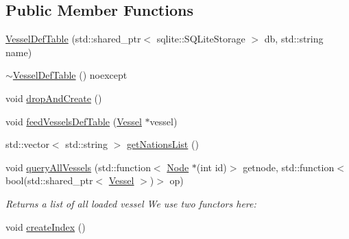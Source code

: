 \subsection*{Public Member Functions}
\begin{DoxyCompactItemize}
\item 
\mbox{\hyperlink{class_vessel_def_table_ae53e48fba0d34fd040f76ab129f74c90}{Vessel\+Def\+Table}} (std\+::shared\+\_\+ptr$<$ sqlite\+::\+S\+Q\+Lite\+Storage $>$ db, std\+::string name)
\item 
\mbox{\hyperlink{class_vessel_def_table_aa5e4705621fdc032c63afc31da38e4f5}{$\sim$\+Vessel\+Def\+Table}} () noexcept
\item 
void \mbox{\hyperlink{class_vessel_def_table_a6ae7ee3294cd0e3a883781d5de8ac504}{drop\+And\+Create}} ()
\item 
void \mbox{\hyperlink{class_vessel_def_table_a75db0406caf2900444c902109054927a}{feed\+Vessels\+Def\+Table}} (\mbox{\hyperlink{class_vessel}{Vessel}} $\ast$vessel)
\item 
std\+::vector$<$ std\+::string $>$ \mbox{\hyperlink{class_vessel_def_table_a6434d5f3e6bf8e8bc4e776902dbcdf3d}{get\+Nations\+List}} ()
\item 
void \mbox{\hyperlink{class_vessel_def_table_afd5c05850c8845cecad71a26afd3ab8f}{query\+All\+Vessels}} (std\+::function$<$ \mbox{\hyperlink{class_node}{Node}} $\ast$(int id)$>$ getnode, std\+::function$<$ bool(std\+::shared\+\_\+ptr$<$ \mbox{\hyperlink{class_vessel}{Vessel}} $>$)$>$ op)
\begin{DoxyCompactList}\small\item\em Returns a list of all loaded vessel We use two functors here\+: \end{DoxyCompactList}\item 
void \mbox{\hyperlink{class_vessel_def_table_a8709b9d8fb2aedcc726ebfcc65f041d9}{create\+Index}} ()
\end{DoxyCompactItemize}
